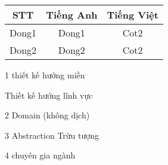 












\begin{table}[h]

\centering

\begin{tabular}{|c|c|c|}

\hline

STT & Tiếng Anh & Tiếng Việt \\

\hline

Dong1 & Dong1 & Cot2 \\

\hline

Dong2 & Dong2 & Cot2 \\

\hline

\end{tabular}

\end{table}









1 thiết kế hướng miền

Thiết kế hướng lĩnh vực

2 Domain (không dịch)

3 Abstraction Trừu tượng

4 chuyên gia ngành


